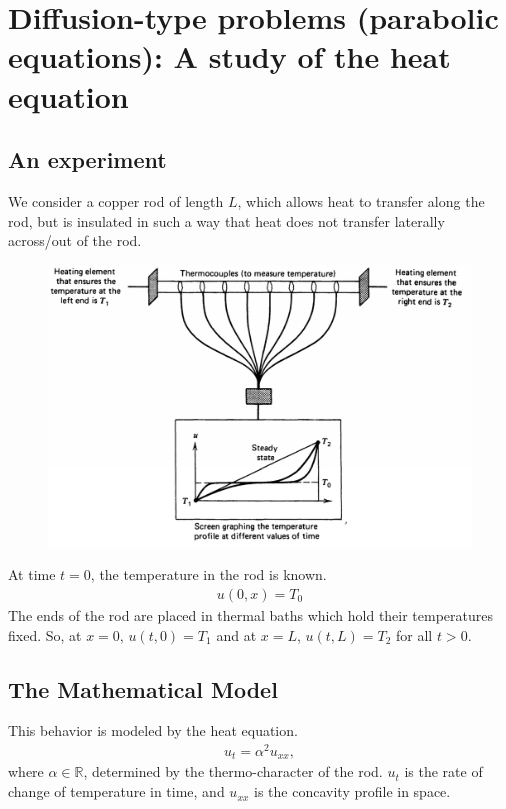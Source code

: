 \documentclass{article}
\theoremstyle{definition}
\begin{document}
\newpage


\section{Diffusion-type problems (parabolic equations): A study of the heat equation}
\subsection{An experiment}
We consider a copper rod of length $L$, which allows heat to transfer along the rod, but is insulated in such a way that heat does not transfer laterally across/out of the rod. 
\begin{figure}[h!]
	\centering
	\includegraphics[scale=0.5]{copper.png}
\end{figure}

At time $t=0$, the temperature in the rod is known.
\begin{align*}
u(0,x) = T_0
\end{align*}
The ends of the rod are placed in thermal baths which hold their temperatures fixed. So, at $x=0$, $u(t,0) = T_1$ and at $x=L$, $u(t,L) = T_2$ for all $t>0$.
\subsection{The Mathematical Model}
This behavior is modeled by the heat equation. 
\begin{align*}
u_t = \alpha^2 u_{xx},
\end{align*}
where $\alpha \in \mathbb{R}$, determined by the thermo-character of the rod. $u_t$ is the rate of change of temperature in time, and $u_{xx}$ is the concavity profile in space. \\
\end{document}
